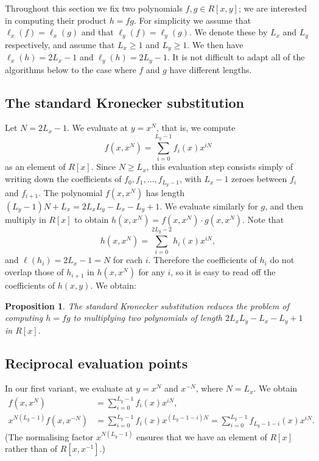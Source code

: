 \documentclass{amsart}
\newtheorem{prop}[thm]{Proposition}
\theoremstyle{definition}
\theoremstyle{remark}
\begin{document}
Throughout this section we fix two polynomials $f, g \in R[x, y]$; we are interested in computing their product $h = fg$. For simplicity we assume that $\ell_x(f) = \ell_x(g)$ and that $\ell_y(f) = \ell_y(g)$. We denote these by $L_x$ and $L_y$ respectively, and assume that $L_x \geq 1$ and $L_y \geq 1$. We then have $\ell_x(h) = 2L_x - 1$ and $\ell_y(h) = 2L_y - 1$. It is not difficult to adapt all of the algorithms below to the case where $f$ and $g$ have different lengths.


\subsection{The standard Kronecker substitution}
\label{sec:polynomial-std}

Let $N = 2 L_x - 1$. We evaluate at $y = x^N$, that is, we compute
 \[ f(x, x^N) = \sum_{i=0}^{L_y - 1} f_i(x) x^{iN} \]
as an element of $R[x]$. Since $N \geq L_x$, this evaluation step consists simply of writing down the coefficients of $f_0, f_1, \ldots, f_{L_y - 1}$, with $L_x - 1$ zeroes between $f_i$ and $f_{i+1}$. The polynomial $f(x, x^N)$ has length $(L_y - 1)N + L_x = 2 L_x L_y - L_x - L_y + 1$. We evaluate similarly for $g$, and then multiply in $R[x]$ to obtain $h(x, x^N) = f(x, x^N) \cdot g(x, x^N)$. Note that
 \[ h(x, x^N) = \sum_{i=0}^{2L_y - 2} h_i(x) x^{iN}, \]
and $\ell(h_i) = 2L_x - 1 = N$ for each $i$. Therefore the coefficients of $h_i$ do not overlap those of $h_{i+1}$ in $h(x, x^N)$ for any $i$, so it is easy to read off the coefficients of $h(x, y)$. We obtain:

\begin{prop}
\label{prop:polynomial-std-ks}
The standard Kronecker substitution reduces the problem of computing $h = fg$ to multiplying two polynomials of length $2 L_x L_y - L_x - L_y + 1$ in $R[x]$.
\end{prop}


\subsection{Reciprocal evaluation points}
\label{sec:polynomial-recip}

In our first variant, we evaluate at $y = x^N$ and $x^{-N}$, where $N = L_x$. We obtain
\begin{align*}
  f(x, x^N) & = \sum_{i=0}^{L_y - 1} f_i(x) x^{iN}, \\
  x^{N(L_y - 1)} f(x, x^{-N}) & = \sum_{i=0}^{L_y - 1} f_i(x) x^{(L_y-1-i)N} = \sum_{i=0}^{L_y - 1} f_{L_y-1-i}(x) x^{iN}.
\end{align*}
(The normalising factor $x^{N(L_y - 1)}$ ensures that we have an element of $R[x]$ rather than of $R[x, x^{-1}]$.)
\end{document}
